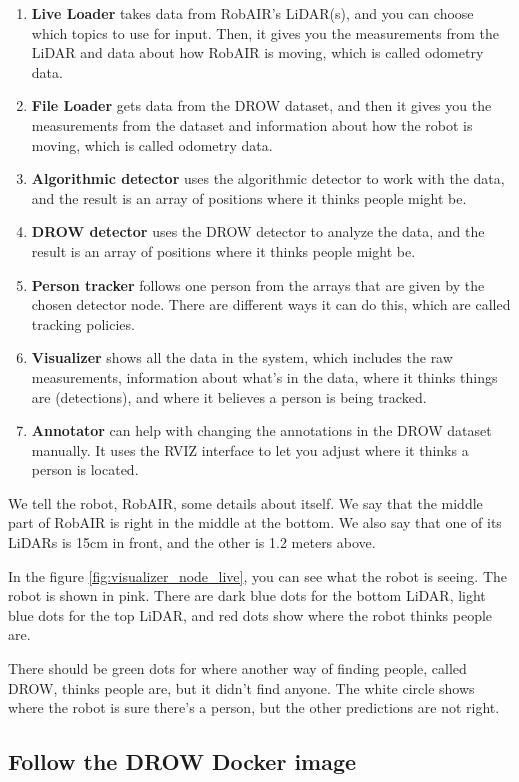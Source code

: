 \documentclass{article}
\begin{document}
\begin{enumerate}
	\item \textbf{Live Loader} takes data from RobAIR's LiDAR(s), and you can choose which topics to use for input. Then, it gives you the measurements from the LiDAR and data about how RobAIR is moving, which is called odometry data.
	\item \textbf{File Loader} gets data from the DROW dataset, and then it gives you the measurements from the dataset and information about how the robot is moving, which is called odometry data.
	\item \textbf{Algorithmic detector} uses the algorithmic detector to work with the data, and the result is an array of positions where it thinks people might be.
	\item \textbf{DROW detector} uses the DROW detector to analyze the data, and the result is an array of positions where it thinks people might be.
	\item \textbf{Person tracker} follows one person from the arrays that are given by the chosen detector node. There are different ways it can do this, which are called tracking policies.
	\item \textbf{Visualizer} shows all the data in the system, which includes the raw measurements, information about what's in the data, where it thinks things are (detections), and where it believes a person is being tracked.
	\item \textbf{Annotator} can help with changing the annotations in the DROW dataset manually. It uses the RVIZ interface to let you adjust where it thinks a person is located.
\end{enumerate}

We tell the robot, RobAIR, some details about itself.
We say that the middle part of RobAIR is right in the middle at the bottom.
We also say that one of its LiDARs is 15cm in front, and the other is 1.2 meters above.

In the figure \ref{fig:visualizer_node_live}, you can see what the robot is seeing.
The robot is shown in pink.
There are dark blue dots for the bottom LiDAR, light blue dots for the top LiDAR, and red dots show where the robot thinks people are.

There should be green dots for where another way of finding people, called DROW, thinks people are, but it didn't find anyone.
The white circle shows where the robot is sure there's a person, but the other predictions are not right.

\subsection{Follow the DROW Docker image}
\end{document}
